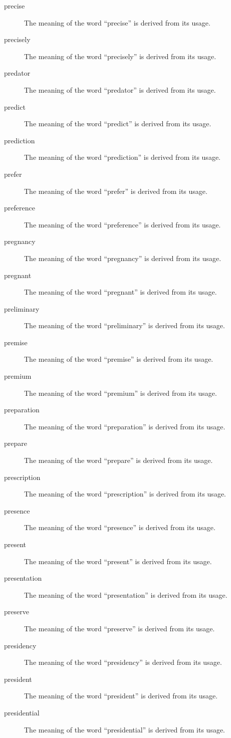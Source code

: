 \documentclass[12pt, letterpaper]{memoir}
\begin{document}
\begin{description}
\item[precise] The meaning of the word ``precise'' is derived from its usage.
\item[precisely] The meaning of the word ``precisely'' is derived from its usage.
\item[predator] The meaning of the word ``predator'' is derived from its usage.
\item[predict] The meaning of the word ``predict'' is derived from its usage.
\item[prediction] The meaning of the word ``prediction'' is derived from its usage.
\item[prefer] The meaning of the word ``prefer'' is derived from its usage.
\item[preference] The meaning of the word ``preference'' is derived from its usage.
\item[pregnancy] The meaning of the word ``pregnancy'' is derived from its usage.
\item[pregnant] The meaning of the word ``pregnant'' is derived from its usage.
\item[preliminary] The meaning of the word ``preliminary'' is derived from its usage.
\item[premise] The meaning of the word ``premise'' is derived from its usage.
\item[premium] The meaning of the word ``premium'' is derived from its usage.
\item[preparation] The meaning of the word ``preparation'' is derived from its usage.
\item[prepare] The meaning of the word ``prepare'' is derived from its usage.
\item[prescription] The meaning of the word ``prescription'' is derived from its usage.
\item[presence] The meaning of the word ``presence'' is derived from its usage.
\item[present] The meaning of the word ``present'' is derived from its usage.
\item[presentation] The meaning of the word ``presentation'' is derived from its usage.
\item[preserve] The meaning of the word ``preserve'' is derived from its usage.
\item[presidency] The meaning of the word ``presidency'' is derived from its usage.
\item[president] The meaning of the word ``president'' is derived from its usage.
\item[presidential] The meaning of the word ``presidential'' is derived from its usage.

\end{description}
\end{document}
